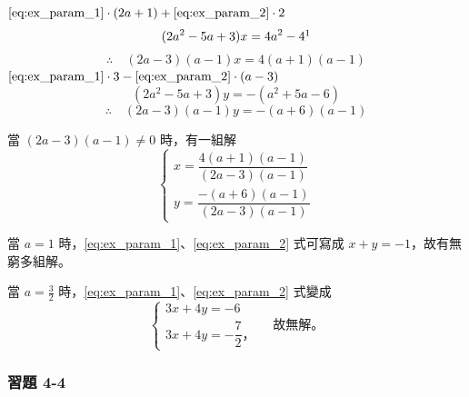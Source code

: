 \begin{solution*}
$\eqref{eq:ex_param_1} \cdot (2a+1) + \eqref{eq:ex_param_2} \cdot 2$
\begin{equation*}
  (2a^2 - 5a + 3)x = 4a^2 - 4 \footnotemark
\end{equation*}
\begin{equation*}
  \therefore \quad (2a-3)(a-1)x = 4(a+1)(a-1)
\end{equation*}
$\eqref{eq:ex_param_1} \cdot 3 - \eqref{eq:ex_param_2} \cdot (a-3)$
\begin{equation*}
  (2a^2 - 5a + 3)y = -(a^2 + 5a - 6)
\end{equation*}
\begin{equation*}
  \therefore \quad (2a-3)(a-1)y = -(a+6)(a-1)
\end{equation*}

當 $(2a-3)(a-1) \neq 0$ 時，有一組解
\begin{equation*}
\begin{cases}
  x = \dfrac{4(a+1)(a-1)}{(2a-3)(a-1)} \\[1.2em]
  y = \dfrac{-(a+6)(a-1)}{(2a-3)(a-1)}
\end{cases}
\end{equation*}

當 $a=1$ 時，\eqref{eq:ex_param_1}、\eqref{eq:ex_param_2} 式可寫成 $x+y=-1$，故有無窮多組解。\footnotemark
{}

當 $a = \frac{3}{2}$ 時，\eqref{eq:ex_param_1}、\eqref{eq:ex_param_2} 式變成
\begin{equation*}
\begin{cases}
  3x+4y = -6 \\
  3x+4y = -\dfrac{7}{2} \text{，}
\end{cases}
\quad \text{故無解。}
\end{equation*}
\end{solution*}

\subsubsection*{習題 4-4}\label{sec:ex4-4}

